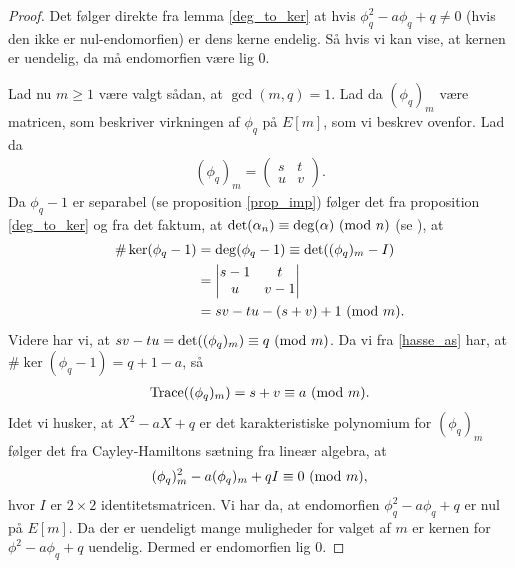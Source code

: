 \begin{proof}
Det følger direkte fra lemma \ref{deg_to_ker} at hvis $\phi_{q}^{2} -a \phi_q + q \neq 0$ (hvis den ikke er nul-endomorfien) er dens kerne endelig. Så hvis vi kan vise, at kernen er uendelig, da må endomorfien være lig $0$.

Lad nu $m \geq 1$ være valgt sådan, at $\gcd(m, q) = 1$. Lad da $(\phi_q)_m$ være matricen, som beskriver virkningen af $\phi_q$ på $E[m]$, som vi beskrev ovenfor. Lad da
\begin{align*}
	(\phi_q)_m = \left( 
	\begin{matrix}
		s & t \\
		u & v
	\end{matrix} \right).
\end{align*}
Da $\phi_q - 1$ er separabel (se proposition \ref{prop_imp}) følger det fra proposition \ref{deg_to_ker} og fra det faktum, at $\det(\alpha_n) \equiv \deg(\alpha) \ (\mathrm{mod} \ n)$ (se \cite[proposition~3.15]{Washington}), at
\begin{align*}
	\# \ker (\phi_q - 1) &= \deg(\phi_q - 1) \equiv \det((\phi_q)_m - I) \\ 
	&= 
	\left| \begin{matrix}
		s-1 & t \\
		u & v - 1 
	\end{matrix} \right| \\
	&= sv - tu - (s + v) + 1 \ (\mathrm{mod} \ m).
\end{align*}
Videre har vi, at $sv-tu = \det((\phi_q)_m) \equiv q \ (\mathrm{mod} \ m)$. Da vi fra \eqref{hasse_as} har, at 
$\# \ker(\phi_q - 1) = q + 1 - a$, så
\begin{align*}
	\text{Trace}((\phi_q)_m) = s + v \equiv a \ (\mathrm{mod} \ m).
\end{align*}
Idet vi husker, at $X^2 - aX + q$ er det karakteristiske polynomium for $(\phi_q)_m$ følger det fra
Cayley-Hamiltons sætning fra lineær algebra, at
\begin{align*}
	(\phi_q)_{m}^{2} - a(\phi_q)_m + qI \equiv 0 \ (\mathrm{mod} \ m),
\end{align*}
hvor $I$ er $2 \times 2$ identitetsmatricen. Vi har da, at endomorfien $\phi_{q}^{2} -a\phi_q + q$ er nul på $E[m]$. Da der er uendeligt mange muligheder for valget af $m$ er kernen for ${\phi}^2 - a\phi_q + q$ uendelig. Dermed er endomorfien lig $0$.


\end{proof}
